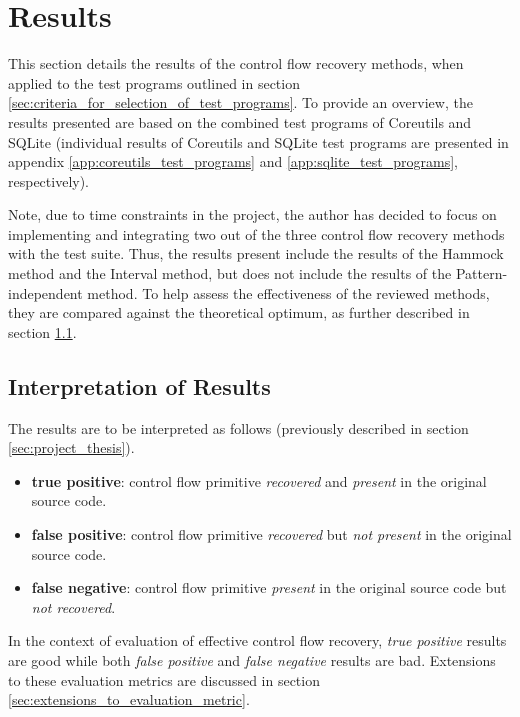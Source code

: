 
\section{Results}

This section details the results of the control flow recovery methods, when applied to the test programs outlined in section \ref{sec:criteria_for_selection_of_test_programs}. To provide an overview, the results presented are based on the combined test programs of Coreutils and SQLite (individual results of Coreutils and SQLite test programs are presented in appendix \ref{app:coreutils_test_programs} and \ref{app:sqlite_test_programs}, respectively).

Note, due to time constraints in the project, the author has decided to focus on implementing and integrating two out of the three control flow recovery methods with the test suite. Thus, the results present include the results of the Hammock method and the Interval method, but does not include the results of the Pattern-independent method. To help assess the effectiveness of the reviewed methods, they are compared against the theoretical optimum, as further described in section \ref{sec:interpretation_of_results}.

\subsection{Interpretation of Results}
\label{sec:interpretation_of_results}

The results are to be interpreted as follows (previously described in section \ref{sec:project_thesis}).

\begin{itemize}
	\item \textbf{true positive}: control flow primitive \textit{recovered} and \textit{present} in the original source code.
	\item \textbf{false positive}: control flow primitive \textit{recovered} but \textit{not present} in the original source code.
	\item \textbf{false negative}: control flow primitive \textit{present} in the original source code but \textit{not recovered}.
\end{itemize}

In the context of evaluation of effective control flow recovery, \textit{true positive} results are good while both \textit{false positive} and \textit{false negative} results are bad. Extensions to these evaluation metrics are discussed in section \ref{sec:extensions_to_evaluation_metric}.

